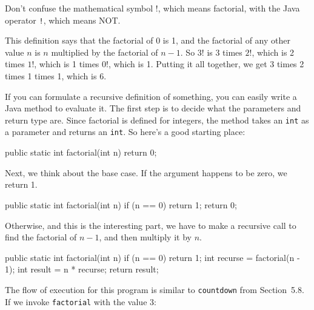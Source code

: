 \documentclass[12pt]{book}
\theoremstyle{exercise}
\newcommand{\java}[1]{\verb"#1"}
\newcommand{\java}[1]{\lstinline{#1}} %
\begin{document}
Don't confuse the mathematical symbol $!$, which means factorial, with the Java operator \java{!}, which means NOT.

This definition says that the factorial of 0 is 1, and the factorial of any other value $n$ is $n$ multiplied by the factorial of $n-1$.
So $3!$ is 3 times $2!$, which is 2 times $1!$, which is 1 times $0!$, which is 1.
Putting it all together, we get 3 times 2 times 1 times 1, which is 6.

If you can formulate a recursive definition of something, you can easily write a Java method to evaluate it.
The first step is to decide what the parameters and return type are.
Since factorial is defined for integers, the method takes an \java{int} as a parameter and returns an \java{int}.
So here's a good starting place:

\begin{code}
    public static int factorial(int n) {
        return 0;
    }
\end{code}

Next, we think about the base case.
If the argument happens to be zero, we return 1.

\begin{code}
    public static int factorial(int n) {
        if (n == 0) {
            return 1;
        }
        return 0;
    }
\end{code}

Otherwise, and this is the interesting part, we have to make a recursive call to find the factorial of $n-1$, and then multiply it by $n$.

\begin{code}
    public static int factorial(int n) {
        if (n == 0) {
            return 1;
        }
        int recurse = factorial(n - 1);
        int result = n * recurse;
        return result;
    }
\end{code}

The flow of execution for this program is similar to \java{countdown} from Section~5.8.
If we invoke \java{factorial} with the value 3:
\end{document}

